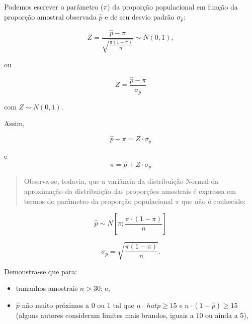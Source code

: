 \documentclass[
]{book}
\providecommand{\tightlist}{%
  \setlength{\itemsep}{0pt}\setlength{\parskip}{0pt}}
\begin{document}
\hfill\break

Podemos escrever o parâmetro (\(\pi\)) da proporção populacional em função da proporção amostral observada \(\hat{p}\) e de seu desvio padrão \(\sigma_{\hat{p}}\):

\hfill\break

\[
Z=\frac{\hat{p}-\pi }{\sqrt{\frac{\pi \left(1-\pi \right)}{n}}} \sim N\left(0,1\right),
\]

\hfill\break

ou

\hfill\break

\[
Z=\frac{\hat{p}-\pi }{{\sigma }_{\hat{p}}}
\]

\hfill\break

com \(Z \sim N\left(0,1\right)\).

\hfill\break

Assim,

\hfill\break

\[
\hat{p} - \pi = Z \cdot  {\sigma }_{\hat{p}}
\]

\hfill\break
e\\

\[
\pi = \hat{p} + Z \cdot  {\sigma }_{\hat{p}}
\]

\hfill\break

\begin{quote}
Observa-se, todavia, que a variância da distribuição Normal da aproximação da distribuição das proporções amostrais é expressa em termos do parâmetro da proporção populacional \(\pi\) que não é conhecido:
\end{quote}

\hfill\break

\[
\hat{p}  \sim  N [\pi ;  \frac{\pi \cdot (1- \pi) }{n} ]
\]

\hfill\break

\[
{\sigma }_{\hat{p}}=\sqrt{\frac{\pi \left(1-\pi \right)}{n}}.
\]

\hfill\break

Demonstra-se que para:

\hfill\break

\begin{itemize}
\tightlist
\item
  tamanhos amostrais \(n > 30\); e,
\item
  \(\hat{p}\) não muito próximos a \(0\) ou \(1\) tal que \(n \cdot\ hat{p} \ge 15\) e \(n \cdot (1-\hat{p}) \ge 15\) (alguns autores consideram limites mais brandos, iguais a 10 ou ainda a 5),
\end{itemize}
\end{document}
